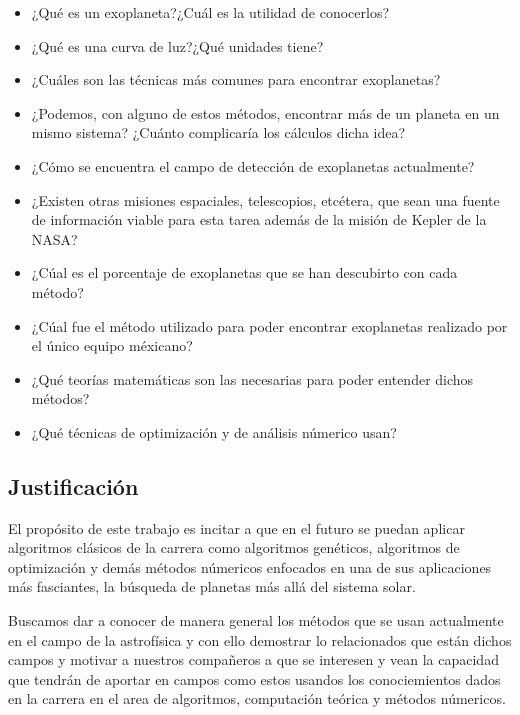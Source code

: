 \documentclass[fleqn, journal]{IEEEtran}                        %
\theoremstyle{break}                                            %
\begin{document}
        \begin{itemize}
            \item ¿Qué es un exoplaneta?¿Cuál es la utilidad de conocerlos?
            \item ¿Qué es una curva de luz?¿Qué unidades tiene?
            \item ¿Cuáles son las técnicas más comunes para encontrar exoplanetas?
            \item ¿Podemos, con alguno de estos métodos, encontrar más de un planeta en un mismo sistema? ¿Cuánto complicaría
                los cálculos dicha idea?
            \item ¿Cómo se encuentra el campo de detección de exoplanetas actualmente?
            \item ¿Existen otras misiones espaciales, telescopios, etcétera, que sean una fuente de información viable
                para esta tarea además de la misión de Kepler de la NASA?
            \item ¿Cúal es el porcentaje de exoplanetas que se han descubirto con cada método?
            \item ¿Cúal fue el método utilizado para poder encontrar exoplanetas realizado por el único equipo
                méxicano?
            \item ¿Qué teorías matemáticas son las necesarias para poder entender dichos métodos?
            \item ¿Qué técnicas de optimización y de análisis númerico usan?
        \end{itemize}


    \vspace{1em}
    \subsection{Justificación}

        El propósito de este trabajo es incitar a que en el futuro se puedan aplicar algoritmos clásicos de la carrera
        como algoritmos genéticos, algoritmos de optimización y demás métodos númericos enfocados en una
        de sus aplicaciones más fasciantes, la búsqueda de planetas más allá del sistema solar.

        Buscamos dar a conocer de manera general los métodos que se usan actualmente en el campo de la
        astrofísica y con ello demostrar lo relacionados que están dichos campos y motivar a nuestros compañeros
        a que se interesen y vean la capacidad que tendrán de aportar en campos como estos usandos los 
        conociemientos dados en la carrera en el area de algoritmos, computación teórica y métodos númericos.
\end{document}

